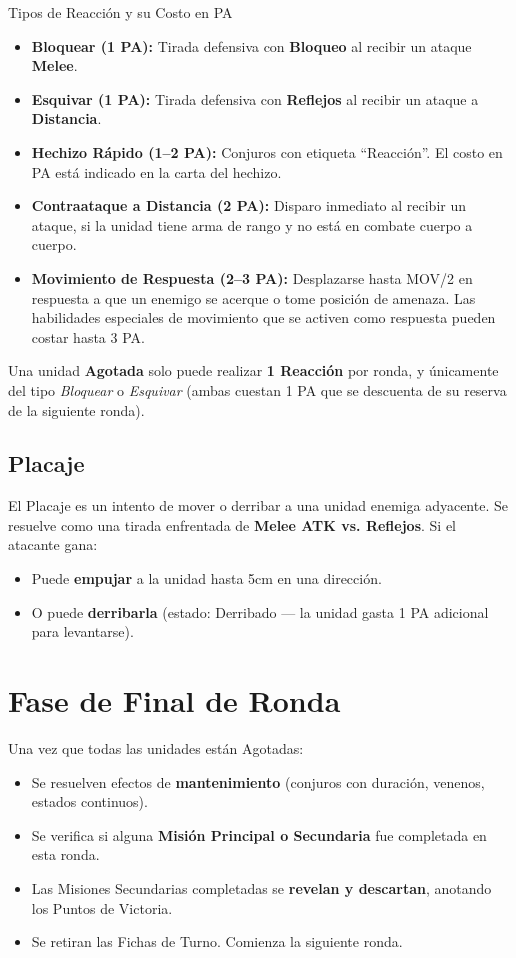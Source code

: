 \begin{reglaespecial}{Tipos de Reacción y su Costo en PA}
\begin{itemize}
    \item \textbf{Bloquear (1 PA):} Tirada defensiva con \textbf{Bloqueo} al recibir un ataque \textbf{Melee}.
    \item \textbf{Esquivar (1 PA):} Tirada defensiva con \textbf{Reflejos} al recibir un ataque a \textbf{Distancia}.
    \item \textbf{Hechizo Rápido (1--2 PA):} Conjuros con etiqueta ``Reacción''. El costo en PA está indicado en la carta del hechizo.
    \item \textbf{Contraataque a Distancia (2 PA):} Disparo inmediato al recibir un ataque, si la unidad tiene arma de rango y no está en combate cuerpo a cuerpo.
    \item \textbf{Movimiento de Respuesta (2--3 PA):} Desplazarse hasta MOV/2 en respuesta a que un enemigo se acerque o tome posición de amenaza. Las habilidades especiales de movimiento que se activen como respuesta pueden costar hasta 3 PA.
\end{itemize}
\end{reglaespecial}

Una unidad \textbf{Agotada} solo puede realizar \textbf{1 Reacción} por ronda, y únicamente del tipo \textit{Bloquear} o \textit{Esquivar} (ambas cuestan 1 PA que se descuenta de su reserva de la siguiente ronda).

\subsection*{Placaje}

El Placaje es un intento de mover o derribar a una unidad enemiga adyacente. Se resuelve como una tirada enfrentada de \textbf{Melee ATK vs. Reflejos}. Si el atacante gana:

\begin{itemize}
    \item Puede \textbf{empujar} a la unidad hasta 5cm en una dirección.
    \item O puede \textbf{derribarla} (estado: Derribado — la unidad gasta 1 PA adicional para levantarse).
\end{itemize}

\section{Fase de Final de Ronda}

Una vez que todas las unidades están Agotadas:

\begin{itemize}
    \item Se resuelven efectos de \textbf{mantenimiento} (conjuros con duración, venenos, estados continuos).
    \item Se verifica si alguna \textbf{Misión Principal o Secundaria} fue completada en esta ronda.
    \item Las Misiones Secundarias completadas se \textbf{revelan y descartan}, anotando los Puntos de Victoria.
    \item Se retiran las Fichas de Turno. Comienza la siguiente ronda.
\end{itemize}
